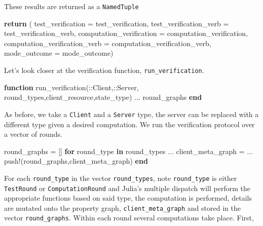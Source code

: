 \documentclass[
]{article}
\newenvironment{Shaded}{}{}
\newcommand{\ControlFlowTok}[1]{\textcolor[rgb]{0.00,0.44,0.13}{\textbf{#1}}}
\newcommand{\DataTypeTok}[1]{\textcolor[rgb]{0.56,0.13,0.00}{#1}}
\newcommand{\FunctionTok}[1]{\textcolor[rgb]{0.02,0.16,0.49}{#1}}
\newcommand{\KeywordTok}[1]{\textcolor[rgb]{0.00,0.44,0.13}{\textbf{#1}}}
\newcommand{\NormalTok}[1]{#1}
\newcommand{\OperatorTok}[1]{\textcolor[rgb]{0.40,0.40,0.40}{#1}}
\begin{document}
These results are returned as a \texttt{NamedTuple}

\begin{Shaded}
\begin{Highlighting}[]
    \ControlFlowTok{return}\NormalTok{ (}
\NormalTok{        test\_verification }\OperatorTok{=}\NormalTok{ test\_verification,}
\NormalTok{        test\_verification\_verb }\OperatorTok{=}\NormalTok{ test\_verification\_verb,}
\NormalTok{        computation\_verification }\OperatorTok{=}\NormalTok{ computation\_verification,}
\NormalTok{        computation\_verification\_verb }\OperatorTok{=}\NormalTok{ computation\_verification\_verb,}
\NormalTok{        mode\_outcome }\OperatorTok{=}\NormalTok{ mode\_outcome)}
\end{Highlighting}
\end{Shaded}

Let's look closer at the verification function,
\texttt{run\_verification}.

\begin{Shaded}
\begin{Highlighting}[]

\KeywordTok{function} \FunctionTok{run\_verification}\NormalTok{(}\OperatorTok{::}\DataTypeTok{Client}\NormalTok{,}\OperatorTok{::}\DataTypeTok{Server}\NormalTok{,}
\NormalTok{    round\_types,client\_resource,state\_type)}
    \OperatorTok{...}
\NormalTok{    round\_graphs}
    \KeywordTok{end}
\end{Highlighting}
\end{Shaded}

As before, we take a \texttt{Client} and a \texttt{Server} type, the
server can be replaced with a different type given a desired
computation. We run the verification protocol over a vector of rounds.

\begin{Shaded}
\begin{Highlighting}[]
\NormalTok{    round\_graphs }\OperatorTok{=}\NormalTok{ []}
    \ControlFlowTok{for}\NormalTok{ round\_type }\KeywordTok{in}\NormalTok{ round\_types}
        \OperatorTok{...}
\NormalTok{        client\_meta\_graph }\OperatorTok{=} \OperatorTok{...}
        \FunctionTok{push!}\NormalTok{(round\_graphs,client\_meta\_graph)}
    \ControlFlowTok{end}
\end{Highlighting}
\end{Shaded}

For each \texttt{round\_type} in the vector \texttt{round\_types}, note
\texttt{round\_type} is either \texttt{TestRound} or
\texttt{ComputationRound} and Julia's multiple dispatch will perform the
appropriate functions based on said type, the computation is performed,
details are mutated onto the property graph,
\texttt{client\_meta\_graph} and stored in the vector
\texttt{round\_graphs}. Within each round several computations take
place. First,
\end{document}
